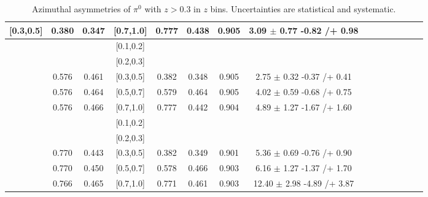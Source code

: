\begin{table}[H]
\begin{tabular}{|c| c| c| c| c| c| c| c| c| c|c| c| c| c| c|}
[0.3,0.5]	&	0.380	&	0.347	&	[0.7,1.0]	&	0.777	&	0.438	&	0.905	&	3.09	$\pm$	0.77	-0.82	/+	0.98	\\ \hline
[0.5,0.7]	&		&		&	[0.1,0.2]	&		&		&		&							\\ \hline
[0.5,0.7]	&		&		&	[0.2,0.3]	&		&		&		&							\\ \hline
[0.5,0.7]	&	0.576	&	0.461	&	[0.3,0.5]	&	0.382	&	0.348	&	0.905	&	2.75	$\pm$	0.32	-0.37	/+	0.41	\\ \hline
[0.5,0.7]	&	0.576	&	0.464	&	[0.5,0.7]	&	0.579	&	0.464	&	0.905	&	4.02	$\pm$	0.59	-0.68	/+	0.75	\\ \hline
[0.5,0.7]	&	0.576	&	0.466	&	[0.7,1.0]	&	0.777	&	0.442	&	0.904	&	4.89	$\pm$	1.27	-1.67	/+	1.60	\\ \hline
[0.7,1.0]	&		&		&	[0.1,0.2]	&		&		&		&							\\ \hline
[0.7,1.0]	&		&		&	[0.2,0.3]	&		&		&		&							\\ \hline
[0.7,1.0]	&	0.770	&	0.443	&	[0.3,0.5]	&	0.382	&	0.349	&	0.901	&	5.36	$\pm$	0.69	-0.76	/+	0.90	\\ \hline
[0.7,1.0]	&	0.770	&	0.450	&	[0.5,0.7]	&	0.578	&	0.466	&	0.903	&	6.16	$\pm$	1.27	-1.37	/+	1.70	\\ \hline
[0.7,1.0]	&	0.766	&	0.465	&	[0.7,1.0]	&	0.771	&	0.461	&	0.903	&	12.40	$\pm$	2.98	-4.89	/+	3.87	\\ \hline
\end{tabular}
\caption{Azimuthal asymmetries of $\pi^0$ with $z>0.3$ in $z$ bins. Uncertainties are statistical and systematic.}
\label{tab:finaletazbin2}
\end{table}

